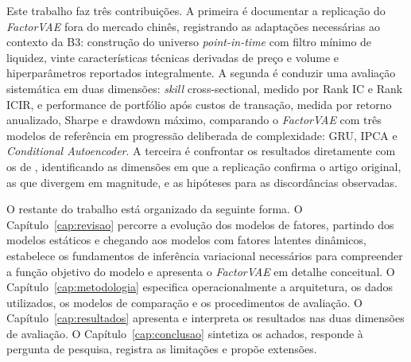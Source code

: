 Este trabalho faz três contribuições. A primeira é documentar a replicação do
\textit{FactorVAE} fora do mercado chinês, registrando as adaptações necessárias ao
contexto da B3: construção do universo \textit{point-in-time} com filtro mínimo de
liquidez, vinte características técnicas derivadas de preço e volume e hiperparâmetros
reportados integralmente. A segunda é conduzir uma avaliação sistemática em duas
dimensões: \textit{skill} cross-sectional, medido por Rank IC e Rank ICIR, e performance
de portfólio após custos de transação, medida por retorno anualizado, Sharpe e drawdown
máximo, comparando o \textit{FactorVAE} com três modelos de referência em progressão
deliberada de complexidade: GRU, IPCA e \textit{Conditional Autoencoder}. A terceira é
confrontar os resultados diretamente com os de \textcite{duan2022}, identificando as
dimensões em que a replicação confirma o artigo original, as que divergem em magnitude,
e as hipóteses para as discordâncias observadas.

O restante do trabalho está organizado da seguinte forma. O Capítulo~\ref{cap:revisao}
percorre a evolução dos modelos de fatores, partindo dos modelos estáticos e chegando aos
modelos com fatores latentes dinâmicos, estabelece os fundamentos de inferência
variacional necessários para compreender a função objetivo do modelo e apresenta o
\textit{FactorVAE} em detalhe conceitual. O Capítulo~\ref{cap:metodologia} especifica
operacionalmente a arquitetura, os dados utilizados, os modelos de comparação e os
procedimentos de avaliação. O Capítulo~\ref{cap:resultados} apresenta e interpreta os
resultados nas duas dimensões de avaliação. O Capítulo~\ref{cap:conclusao} sintetiza os
achados, responde à pergunta de pesquisa, registra as limitações e propõe extensões.
